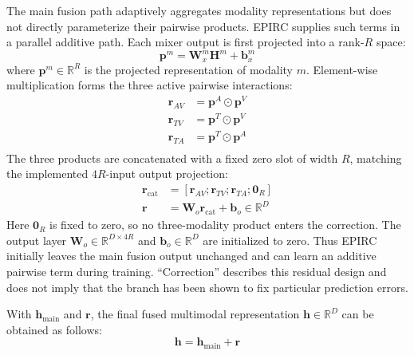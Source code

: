 \documentclass[letterpaper]{article} %
\begin{document}
The main fusion path adaptively aggregates modality representations but does not directly parameterize their pairwise products. EPIRC supplies such terms in a parallel additive path. Each mixer output is first projected into a rank-$R$ space:
\begin{equation}
\mathbf{p}^{m}
=\mathbf{W}_{x}^{m}\mathbf{H}^{m}
+\mathbf{b}_{x}^{m}
\end{equation}
where $\mathbf{p}^{m}\in\mathbb{R}^{R}$ is the projected representation of modality $m$. Element-wise multiplication forms the three active pairwise interactions:
\begin{equation}
\begin{aligned}
\mathbf{r}_{AV}&=\mathbf{p}^{A}\odot\mathbf{p}^{V}\\
\mathbf{r}_{TV}&=\mathbf{p}^{T}\odot\mathbf{p}^{V}\\
\mathbf{r}_{TA}&=\mathbf{p}^{T}\odot\mathbf{p}^{A}\\
\end{aligned}
\label{eq:pairwise_interact}
\end{equation}
The three products are concatenated with a fixed zero slot of width $R$, matching the implemented $4R$-input output projection:
\begin{equation}
\begin{aligned}
\mathbf{r}_{\mathrm{cat}} &=[\mathbf{r}_{AV};\mathbf{r}_{TV};\mathbf{r}_{TA};\mathbf{0}_{R}]\\
\mathbf{r}&=\mathbf{W}_{o}\mathbf{r}_{\mathrm{cat}}
  +\mathbf{b}_{o}\in\mathbb{R}^{D}
\end{aligned}
\label{eq:pairwise_residual}
\end{equation}
Here $\mathbf{0}_{R}$ is fixed to zero, so no three-modality product enters the correction. The output layer $\mathbf{W}_{o}\in\mathbb{R}^{D\times4R}$ and $\mathbf{b}_{o}\in\mathbb{R}^{D}$ are initialized to zero. Thus EPIRC initially leaves the main fusion output unchanged and can learn an additive pairwise term during training. ``Correction'' describes this residual design and does not imply that the branch has been shown to fix particular prediction errors.

With $\mathbf{h}_{\mathrm{main}}$ and $\mathbf{r}$, the final fused multimodal representation $\mathbf{h}\in\mathbb{R}^{D}$ can be obtained as follows:
\begin{equation}
\mathbf{h}
=\mathbf{h}_{\mathrm{main}}+\mathbf{r}
\label{eq:final_representation}
\end{equation}
\end{document}
